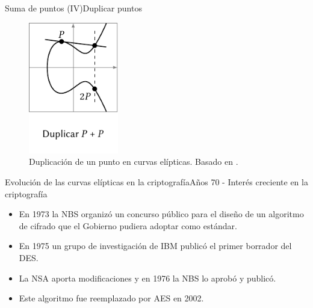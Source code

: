 \documentclass[spanish]{beamer}
\begin{document}
\begin{frame}{Suma de puntos (IV)}{Duplicar puntos}
  \begin{figure}[h]
    \centering
    \includegraphics[width=0.35\textwidth]{img/duplicar-curvas}
    \caption{Duplicación de un punto en curvas elípticas. Basado en  \parencite{eichlseder_elliptic_2016}.}
    \label{fig:duplicar-curvas}
  \end{figure}  
\end{frame}


\begin{frame}[fragile]{Evolución de las curvas elípticas en la criptografía}{Años 70 - Interés creciente en la criptografía}
  \begin{itemize}
    \item En 1973 la NBS organizó un concurso público para el diseño de un algoritmo de cifrado que el Gobierno pudiera adoptar como estándar.
    \item En 1975 un grupo de investigación de IBM publicó el primer borrador del DES.
    \item La NSA aporta modificaciones y en 1976 la NBS lo aprobó y publicó. %
    \item Este algoritmo fue reemplazado por AES en 2002.
  \end{itemize}
\end{frame}
\end{document}
